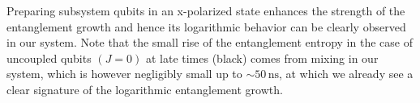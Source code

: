 Preparing subsystem qubits in an x-polarized state enhances the strength of the entanglement growth and hence its logarithmic behavior can be clearly observed in our system.
Note that the small rise of the entanglement entropy in the case of uncoupled qubits $\left( J=0 \right)$ at late times (black) comes from mixing in our system, which is however negligibly small up to $\sim50\,\text{ns}$, at which we already see a clear signature of the logarithmic entanglement growth.




